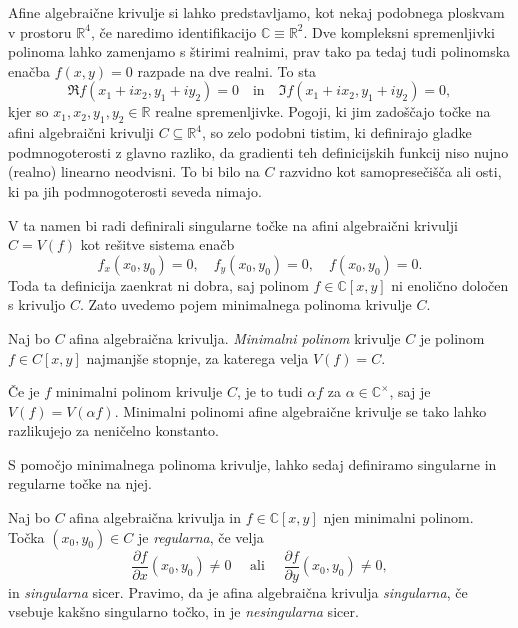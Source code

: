\documentclass[mat1]{fmfdelo}
\newcommand{\R}{\mathbb R}
\newcommand{\C}{\mathbb C}
\newcommand{\CM}{\mathbb C ^\times}
\theoremstyle{definition}
\begin{document}
Afine algebraične krivulje si lahko predstavljamo, kot nekaj podobnega ploskvam v prostoru $\R^4$, če naredimo identifikacijo $\C \equiv \R^2$. Dve kompleksni spremenljivki polinoma lahko zamenjamo s štirimi realnimi, prav tako pa tedaj tudi polinomska enačba $f(x,y) = 0$ razpade na dve realni. To sta
\[
    \Re f(x_1 + ix_2, y_1 + iy_2) = 0 \quad \text{in} \quad \Im f(x_1 + ix_2, y_1 + iy_2) = 0,
\]
kjer so $x_1, x_2, y_1, y_2 \in \R$ realne spremenljivke.
Pogoji, ki jim zadoščajo točke na afini algebraični krivulji $C \subseteq \R^4$, so zelo podobni tistim, ki definirajo gladke pod\-mnogoterosti z glavno razliko, da gradienti teh definicijskih funkcij niso nujno (realno) linearno neodvisni. To bi bilo na $C$ razvidno kot samopresečišča ali osti, ki pa jih podmnogoterosti seveda nimajo. 
\par
V ta namen bi radi definirali singularne točke na afini algebraični krivulji $C = V(f)$ kot rešitve sistema enačb 
\[ 
    f_x(x_0, y_0) = 0, \quad f_y(x_0, y_0) = 0, \quad f(x_0, y_0) = 0.
\]
Toda ta definicija zaenkrat ni dobra, saj polinom $f \in \C[x,y]$ ni enolično določen s krivuljo $C$. 
Zato uvedemo pojem minimalnega polinoma krivulje $C$.

\begin{definicija}
    Naj bo $C$ afina algebraična krivulja. \emph{Minimalni polinom} krivulje $C$ je polinom $f \in C[x,y]$ najmanjše stopnje, za katerega velja $V(f) = C$.
\end{definicija}

\begin{opomba}
    Če je $f$ minimalni polinom krivulje $C$, je to tudi $\alpha f$ za $\alpha \in \CM$, saj je $V(f) = V(\alpha f)$. Minimalni polinomi afine algebraične krivulje se tako lahko razlikujejo za neničelno konstanto.
\end{opomba}

S pomočjo minimalnega polinoma krivulje, lahko sedaj definiramo singularne in regularne točke na njej.

\begin{definicija}
    \label{reg sing tocke}
    Naj bo $C$ afina algebraična krivulja in $f \in \C[x,y]$ njen minimalni polinom. Točka $(x_0, y_0) \in C$ je \emph{regularna}, če velja
    \[
        \frac{\partial f}{\partial x}(x_0, y_0) \neq 0 \quad \text{ ali } \quad \frac{\partial f}{\partial y}(x_0, y_0) \neq 0,
    \] 
    in \emph{singularna} sicer. Pravimo, da je afina algebraična krivulja \emph{singularna}, če vsebuje kakšno singularno točko, in je \emph{nesingularna} sicer.
\end{definicija}
\end{document}
